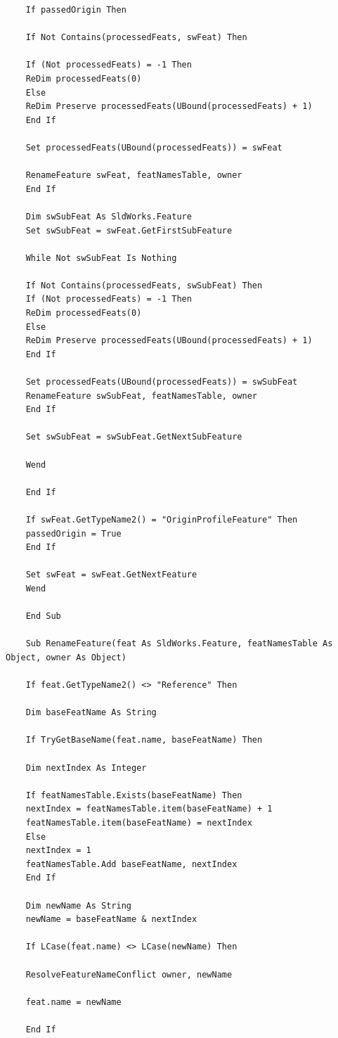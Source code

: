 \documentclass{report}
\begin{document}
\begin{lstlisting}
	If passedOrigin Then
	
	If Not Contains(processedFeats, swFeat) Then
	
	If (Not processedFeats) = -1 Then
	ReDim processedFeats(0)
	Else
	ReDim Preserve processedFeats(UBound(processedFeats) + 1)
	End If
	
	Set processedFeats(UBound(processedFeats)) = swFeat
	
	RenameFeature swFeat, featNamesTable, owner
	End If
	
	Dim swSubFeat As SldWorks.Feature
	Set swSubFeat = swFeat.GetFirstSubFeature
	
	While Not swSubFeat Is Nothing
	
	If Not Contains(processedFeats, swSubFeat) Then
	If (Not processedFeats) = -1 Then
	ReDim processedFeats(0)
	Else
	ReDim Preserve processedFeats(UBound(processedFeats) + 1)
	End If
	
	Set processedFeats(UBound(processedFeats)) = swSubFeat
	RenameFeature swSubFeat, featNamesTable, owner
	End If
	
	Set swSubFeat = swSubFeat.GetNextSubFeature
	
	Wend
	
	End If
	
	If swFeat.GetTypeName2() = "OriginProfileFeature" Then
	passedOrigin = True
	End If
	
	Set swFeat = swFeat.GetNextFeature
	Wend
	
	End Sub
	
	Sub RenameFeature(feat As SldWorks.Feature, featNamesTable As Object, owner As Object)
	
	If feat.GetTypeName2() <> "Reference" Then
	
	Dim baseFeatName As String
	
	If TryGetBaseName(feat.name, baseFeatName) Then
	
	Dim nextIndex As Integer
	
	If featNamesTable.Exists(baseFeatName) Then
	nextIndex = featNamesTable.item(baseFeatName) + 1
	featNamesTable.item(baseFeatName) = nextIndex
	Else
	nextIndex = 1
	featNamesTable.Add baseFeatName, nextIndex
	End If
	
	Dim newName As String
	newName = baseFeatName & nextIndex
	
	If LCase(feat.name) <> LCase(newName) Then
	
	ResolveFeatureNameConflict owner, newName
	
	feat.name = newName
	
	End If
	

\end{lstlisting}
\end{document}

